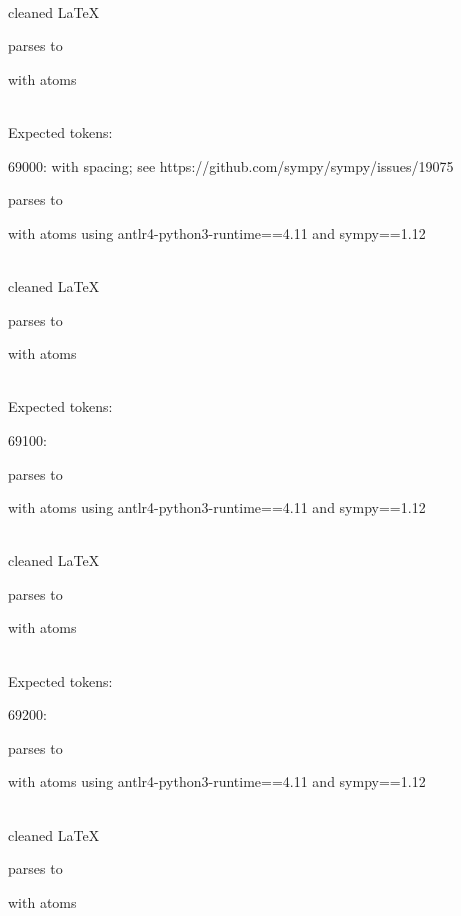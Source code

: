 \documentclass{article}
\begin{document}
\ \\
cleaned \LaTeX

parses to

with atoms


\ \\
Expected tokens:



\hrulefill

69000:
with spacing; see https://github.com/sympy/sympy/issues/19075

parses to

with atoms
using antlr4-python3-runtime==4.11 and sympy==1.12

\ \\
cleaned \LaTeX

parses to

with atoms


\ \\
Expected tokens:


\hrulefill

69100:

parses to

with atoms
using antlr4-python3-runtime==4.11 and sympy==1.12

\ \\
cleaned \LaTeX

parses to

with atoms


\ \\
Expected tokens:



\hrulefill

69200:

parses to

with atoms
using antlr4-python3-runtime==4.11 and sympy==1.12

\ \\
cleaned \LaTeX

parses to

with atoms

\end{document}
